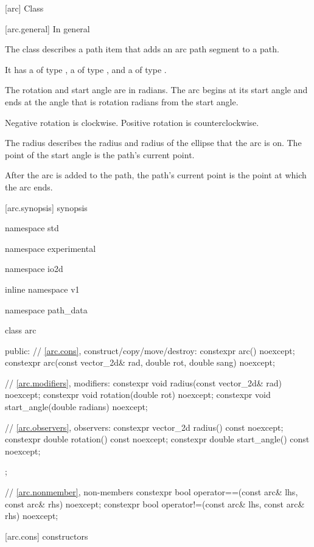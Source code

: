  [arc] {Class }%

 [arc.general] {In general}%

\pnum
{}%
The class  describes a path item that adds an arc path segment to a path.

\pnum
It has a  of type , a  of type , and a  of type .

\pnum
The rotation and start angle are in radians. The arc begins at its start angle and ends at the angle that is rotation radians from the start angle.

\pnum
\begin{note}
Negative rotation is clockwise. Positive rotation is counterclockwise.
\end{note}

\pnum
The radius describes the \xaxis radius and \yaxis radius of the ellipse that the arc is on. The point of the start angle is the path's current point.

\pnum
After the arc is added to the path, the path's current point is the point at which the arc ends.

 [arc.synopsis] { synopsis}%

\begin{codeblock}
namespace std { namespace experimental { namespace io2d { inline namespace v1 {
  namespace path_data {
    class arc {
    public:
      // \ref{arc.cons}, construct/copy/move/destroy:
      constexpr arc() noexcept;
      constexpr arc(const vector_2d& rad,
        double rot, double sang) noexcept;

      // \ref{arc.modifiers}, modifiers:
      constexpr void radius(const vector_2d& rad) noexcept;
      constexpr void rotation(double rot) noexcept;
      constexpr void start_angle(double radians) noexcept;

      // \ref{arc.observers}, observers:
      constexpr vector_2d radius() const noexcept;
      constexpr double rotation() const noexcept;
      constexpr double start_angle() const noexcept;
    };
    
    // \ref{arc.nonmember}, non-members
    constexpr bool operator==(const arc& lhs, const arc& rhs) noexcept;
    constexpr bool operator!=(const arc& lhs, const arc& rhs) noexcept;
  }
} } } }
\end{codeblock}

 [arc.cons] { constructors}%

